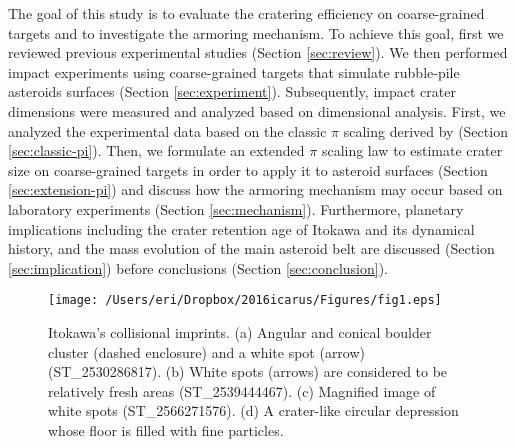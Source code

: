 \documentclass[3p,authoryear]{elsarticle}
\begin{document}
The goal of this study is to evaluate the cratering efficiency on coarse-grained targets and to investigate the armoring mechanism. To achieve this goal, first we reviewed previous experimental studies (Section \ref{sec:review}). We then performed impact experiments using coarse-grained targets that simulate rubble-pile asteroids surfaces (Section \ref{sec:experiment}). Subsequently, impact crater dimensions were measured and analyzed based on dimensional analysis. First, we analyzed the experimental data based on the classic $\pi$ scaling derived by \citet{holsapple1993} (Section \ref{sec:classic-pi}). Then, we formulate an extended $\pi$ scaling law to estimate crater size on coarse-grained targets in order to apply it to asteroid surfaces (Section \ref{sec:extension-pi}) and discuss how the armoring mechanism may occur based on laboratory experiments (Section \ref{sec:mechanism}). Furthermore, planetary implications including the crater retention age of Itokawa and its dynamical history, and the mass evolution of the main asteroid belt are discussed (Section \ref{sec:implication}) before conclusions (Section \ref{sec:conclusion}).

\begin{figure*}[tbp]
	\begin{center}
	\texttt{[image: /Users/eri/Dropbox/2016icarus/Figures/fig1.eps]}
	\caption{Itokawa's collisional imprints. (a) Angular and conical boulder cluster (dashed enclosure) and a white spot (arrow) (ST{\_}2530286817). (b) White spots (arrows) are considered to be relatively fresh areas (ST{\_}2539444467). (c) Magnified image of white spots (ST{\_}2566271576). (d) A crater-like circular depression whose floor is filled with fine particles. \citep{nakamura2008, hirata2009}}
	\label{amica}
	\end{center}
\end{figure*}

\end{document}
